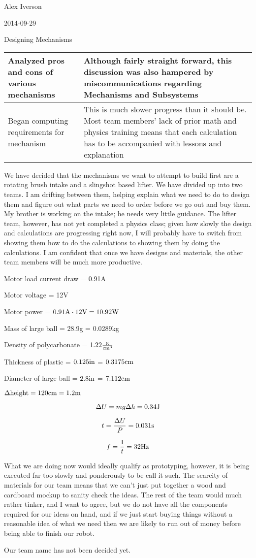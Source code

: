 Alex Iverson

2014-09-29

Designing Mechanisms

\begin{tabular}{|p{5cm}|p{5cm}|}
 \hline
 Analyzed pros and cons of various mechanisms
 &
 Although fairly straight forward, this discussion was also hampered by miscommunications regarding Mechanisms and Subsystems
 \\
 \hline
 Began computing requirements for mechanism
 &
 This is much slower progress than it should be. Most team members’ lack of prior math and physics training means that each calculation has to be accompanied with lessons and explanation
 \\
 \hline
\end{tabular}

We have decided that the mechanisms we want to attempt to build first are a rotating brush intake and a slingshot based lifter. We have divided up into two teams. I am drifting between them, helping explain what we need to do to design them and figure out what parts we need to order before we go out and buy them. My brother is working on the intake; he needs very little guidance. The lifter team, however, has not yet completed a physics class; given how slowly the design and calculations are progressing right now, I will probably have to switch from showing them how to do the calculations to showing them by doing the calculations. I am confident that once we have designs and materials, the other team members will be much more productive. 

Motor load current draw = 0.91A

Motor voltage = 12V

Motor power = $0.91\rm{A}\cdot12\rm{V} = 10.92\rm{W}$

Mass of large ball = 28.9g = 0.0289kg

Density of polycarbonate = $1.22\frac{\rm{g}}{\rm{cm}^3}$

Thickness of plastic = $0.125\rm{in}$ = $0.3175\rm{cm}$

Diameter of large ball = $2.8\rm{in}$ = $7.112\rm{cm}$

$\Delta \rm{height} = 120\rm{cm} = 1.2\rm{m}$

\[\Delta U = m g \Delta h = 0.34\rm{J}\]

\[t = \frac{\Delta U}{P} = 0.031\rm{s}\]

\[f = \frac{1}{t} = 32\rm{Hz}\]

\medskip

What we are doing now would ideally qualify as prototyping, however, it is being executed far too slowly and ponderously to be call it such. The scarcity of materials for our team means that we can’t just put together a wood and cardboard mockup to sanity check the ideas. The rest of the team would much rather tinker, and I want to agree, but we do not have all the components required for our ideas on hand, and if we just start buying things without a reasonable idea of what we need then we are likely to run out of money before being able to finish our robot.

Our team name has not been decided yet.
